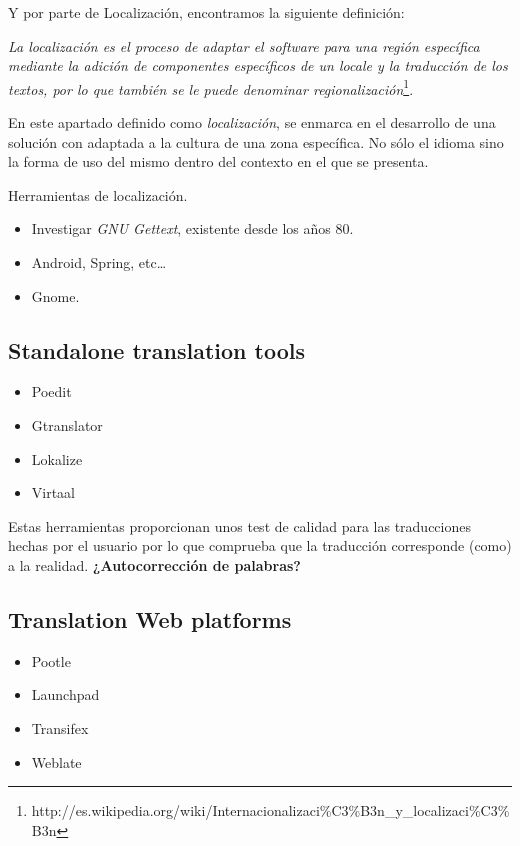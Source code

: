 \documentclass[11pt]{article}
\begin{document}
\par Y por parte de Localizaci\'on, encontramos la siguiente definici\'on:

\emph{La localizaci\'on es el proceso de adaptar el software para una regi\'on espec\'ifica mediante la adici\'on de componentes espec\'ificos de un locale y la traducci\'on de los textos, por lo que tambi\'en se le puede denominar regionalizaci\'on}\footnote{http://es.wikipedia.org/wiki/Internacionalizaci\%C3\%B3n\_y\_localizaci\%C3\%B3n}.

\par En este apartado definido como \emph{localizaci\'on}, se enmarca en el desarrollo de una soluci\'on con adaptada a la cultura de una zona espec\'ifica. No s\'olo el idioma sino la forma de uso del mismo dentro del contexto en el que se presenta.

\par Herramientas de localizaci\'on.

\begin{itemize}
    \item Investigar \emph{GNU Gettext}, existente desde los a\~nos 80.
    \item Android, Spring, etc\ldots
    \item Gnome.
\end{itemize}

\subsection{Standalone translation tools}

\begin{itemize}
	\item Poedit
	\item Gtranslator
	\item Lokalize
	\item Virtaal
\end{itemize}

\par Estas herramientas proporcionan unos test de calidad para las traducciones hechas por el usuario por lo que comprueba que la traducci\'on corresponde (como) a la realidad. \textbf{¿Autocorrecci\'on de palabras?}

\subsection{Translation Web platforms}

\begin{itemize}
	\item Pootle
	\item Launchpad
	\item Transifex
	\item Weblate
\end{itemize}
\end{document}
